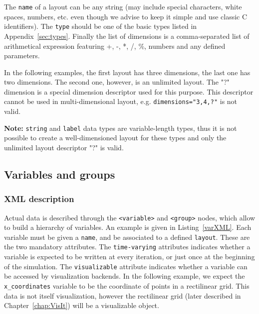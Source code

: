 \documentclass[11pt]{report}
\begin{document}
The \texttt{name} of a layout can be any string (may include special characters, white spaces, numbers, etc. even
though we advise to keep it simple and use classic C identifiers).
The \texttt{type} should be one of the basic types listed in Appendix~\ref{sec:types}.
Finally the list of dimensions is a comma-separated list of arithmetical expression featuring
+, -, *, /, \%, numbers and any defined parameters.

In the following examples, the first layout has three dimensions, the last one has two dimensions.
The second one, however, is an unlimited layout. The "?" dimension is a special dimension descriptor
used for this purpose. This descriptor cannot be used in multi-dimensional layout, e.g. \texttt{dimensions="3,4,?"}
is not valid.

\noindent\begin{minipage}{\textwidth}
\vspace{0.5cm}

\end{minipage}

\textbf{Note:} \texttt{string} and \texttt{label} data types are variable-length types, thus
it is not possible to create a well-dimensioned layout for these types and only the unlimited layout descriptor "?"
is valid.

\subsection{Variables and groups}

\subsubsection{XML description}

Actual data is described through the \texttt{<variable>} and \texttt{<group>} nodes, which
allow to build a hierarchy of variables. An example is given in Listing~\ref{varXML}.
Each variable must be given a \texttt{name}, and be associated to a defined \texttt{layout}.
These are the two mandatory attributes. The \texttt{time-varying} attributes indicates whether
a variable is expected to be written at every iteration, or just once at the beginning of the
simulation. The \texttt{visualizable} attribute indicates whether a variable can be accessed
by visualization backends. In the following example, we expect the \texttt{x\_coordinates} variable
to be the coordinate of points in a rectilinear grid. This data is not itself visualization, however
the rectilinear grid (later described in Chapter~\ref{chap:VisIt}) will be a visualizable object.
\end{document}
